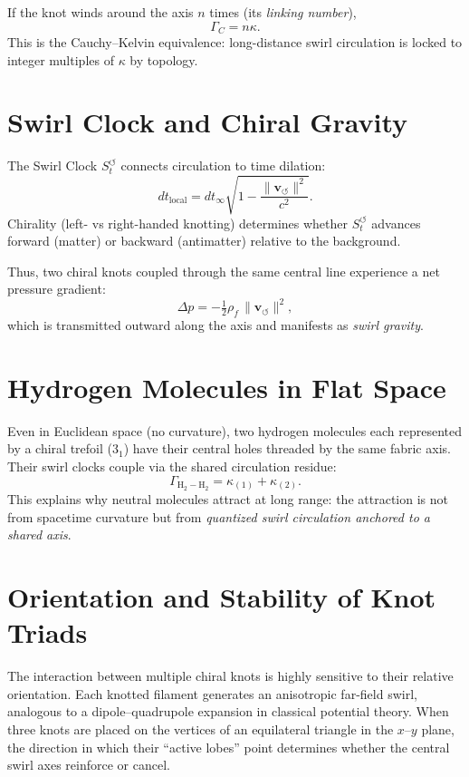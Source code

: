 \documentclass[11pt]{article}
\newcommand{\vswirl}{\mathbf{v}_{\!\boldsymbol{\circlearrowleft}}}
\newcommand{\SwirlClock}{S_t^{\boldsymbol{\circlearrowleft}}}
\newcommand{\rhoF}{\rho_{\!f}}
\newcommand{\GammaC}{\Gamma_C}
\begin{document}
If the knot winds around the axis $n$ times (its \emph{linking number}),
\begin{equation}
\GammaC = n \kappa.
\end{equation}
This is the Cauchy--Kelvin equivalence: long-distance swirl circulation is locked to integer multiples of $\kappa$ by topology.

\section{Swirl Clock and Chiral Gravity}
The Swirl Clock $\SwirlClock$ connects circulation to time dilation:
\begin{equation}
dt_{\text{local}} = dt_\infty \sqrt{1 - \frac{\lVert \vswirl \rVert^2}{c^2}}.
\end{equation}
Chirality (left- vs right-handed knotting) determines whether $\SwirlClock$ advances forward (matter) or backward (antimatter) relative to the background.

Thus, two chiral knots coupled through the same central line experience a net pressure gradient:
\begin{equation}
\Delta p = -\tfrac{1}{2}\rhoF \, \lVert \vswirl \rVert^2,
\end{equation}
which is transmitted outward along the axis and manifests as \emph{swirl gravity}.

\section{Hydrogen Molecules in Flat Space}
Even in Euclidean space (no curvature), two hydrogen molecules each represented by a chiral trefoil ($3_1$) have their central holes threaded by the same fabric axis.
Their swirl clocks couple via the shared circulation residue:
\[
\Gamma_{\text{H}_2-\text{H}_2} = \kappa_{(1)} + \kappa_{(2)}.
\]
This explains why neutral molecules attract at long range: the attraction is not from spacetime curvature but from \emph{quantized swirl circulation anchored to a shared axis}.

\section{Orientation and Stability of Knot Triads}
The interaction between multiple chiral knots is highly sensitive to their
relative orientation. Each knotted filament generates an anisotropic far-field
swirl, analogous to a dipole--quadrupole expansion in classical potential
theory. When three knots are placed on the vertices of an equilateral triangle
in the $x$--$y$ plane, the direction in which their ``active lobes'' point
determines whether the central swirl axes reinforce or cancel.
\end{document}
